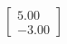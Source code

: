 \documentclass[preview]{standalone}
\begin{document}
\begin{align*}
\begin{bmatrix} 5.00 \\ -3.00 \end{bmatrix}
\end{align*}
\end{document}
